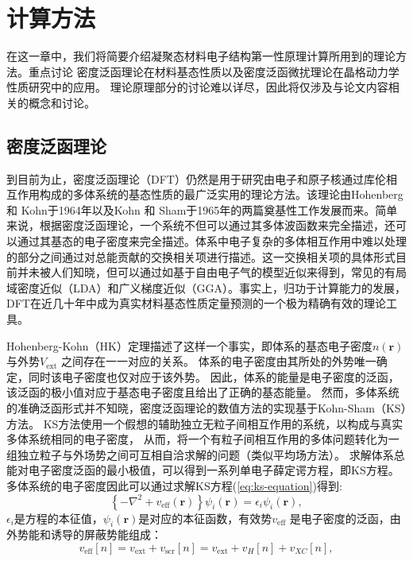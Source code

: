 \chapter{计算方法}\label{chapter:theory}
\newcommand{\ubm}[1]{\{\bm{#1}\}}

在这一章中，我们将简要介绍凝聚态材料电子结构第一性原理计算所用到的理论方法。重点讨论
密度泛函理论在材料基态性质以及密度泛函微扰理论在晶格动力学性质研究中的应用。
理论原理部分的讨论难以详尽，因此将仅涉及与论文内容相关的概念和讨论。

\section{密度泛函理论}

到目前为止，密度泛函理论（DFT）仍然是用于研究由电子和原子核通过库伦相互作用构成的多体系统的基态性质的最广泛实用的理论方法。该理论由Hohenberg 和 Kohn\cite{hohenberg1964inhomogeneous}于1964年以及Kohn 和 Sham\cite{kohn1965self}于1965年的两篇奠基性工作发展而来。简单来说，根据密度泛函理论，一个系统不但可以通过其多体波函数来完全描述，还可以通过其基态的电子密度来完全描述。体系中电子复杂的多体相互作用中难以处理的部分之间通过对总能贡献的交换相关项进行描述。这一交换相关项的具体形式目前并未被人们知晓，但可以通过如基于自由电子气的模型近似来得到，常见的有局域密度近似（LDA）和广义梯度近似（GGA）。事实上，归功于计算能力的发展，DFT在近几十年中成为真实材料基态性质定量预测的一个极为精确有效的理论工具。

Hohenberg-Kohn（HK）定理描述了这样一个事实，即体系的基态电子密度$n(\bm{r})$与外势$V_\mathrm{ext}$ 之间存在一一对应的关系。
体系的电子密度由其所处的外势唯一确定，同时该电子密度也仅对应于该外势。
因此，体系的能量是电子密度的泛函，该泛函的极小值对应于基态电子密度且给出了正确的基态能量。
然而，多体系统的准确泛函形式并不知晓，密度泛函理论的数值方法的实现基于Kohn-Sham（KS）方法。
KS方法使用一个假想的辅助独立无粒子间相互作用的系统，以构成与真实多体系统相同的电子密度，
从而，将一个有粒子间相互作用的多体问题转化为一组独立粒子与外场势之间可互相自洽求解的问题（类似平均场方法）。
求解体系总能对电子密度泛函的最小极值，可以得到一系列单电子薛定谔方程，即KS方程。多体系统的电子密度因此可以通过求解KS方程(\ref{eq:ks-equation})得到:
\begin{equation}\label{eq:ks-equation}
  \left\{ -\nabla^2 + v_{\mathrm{eff}}(\bm{r}) \right\}\psi_i(\bm{r}) = \epsilon_i \psi_i (\bm{r}),
\end{equation}
$\epsilon_i$是方程的本征值，$\psi_i(\bm{r})$是对应的本征函数，有效势$v_{\mathrm{eff}}$ 是电子密度的泛函，由外势能和诱导的屏蔽势能组成：
\begin{equation}
  v_{\mathrm{eff}}[n] = v_{\mathrm{ext}} + v_{\mathrm{scr}}[n] =
  v_{\mathrm{ext}} + v_{H}[n] + v_{XC}[n],
\end{equation}


